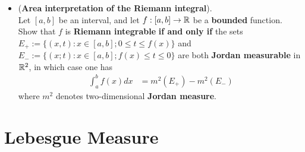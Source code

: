 \documentclass[11pt]{article}
\begin{document}
\begin{itemize}
\item \begin{exercise} (\textbf{Area interpretation of the Riemann integral}).  \citep{tao2011introduction}\\ 
Let $[a, b]$ be an interval, and let $f: [a, b] \rightarrow {\mathbb R}$ be a \textbf{bounded} function. Show that $f$ is \textbf{Riemann integrable} \textbf{if and only if} the sets $E_{+}:=
\{(x, t) : x \in [a, b]; 0 \le t \le f(x)\}$ and $E_{-} := \{ (x; t) : x \in [a, b];  f(x) \le t \le 0\}$ are both \textbf{Jordan measurable} in ${\mathbb R}^2$, in which case one has
\begin{align*}
\int_{a}^{b} f(x) dx &= m^2(E_{+}) - m^2(E_{-})
\end{align*} where $m^2$ denotes two-dimensional \textbf{Jordan measure}. 
\end{exercise}
\end{itemize}

\section{Lebesgue Measure}
\end{document}
